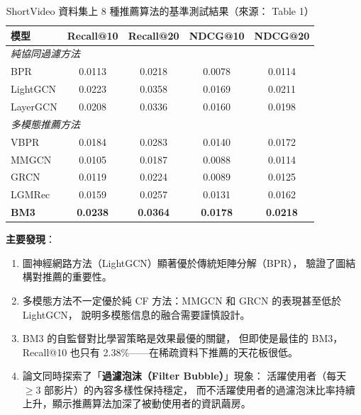 \documentclass[12pt, a4paper]{article}
\begin{document}
\begin{table}[H]
\centering
\caption{ShortVideo 資料集上 8 種推薦算法的基準測試結果（來源：\citealt{shang2025shortvideo} Table 1）}
\label{tab:original_results}
\footnotesize
\begin{tabular}{lcccc}
\toprule
\textbf{模型} & \textbf{Recall@10} & \textbf{Recall@20} & \textbf{NDCG@10} & \textbf{NDCG@20} \\
\midrule
\multicolumn{5}{l}{\textit{純協同過濾方法}} \\
BPR \citep{rendle2009bpr}        & 0.0113 & 0.0218 & 0.0078 & 0.0114 \\
LightGCN \citep{he2020lightgcn}  & 0.0223 & 0.0358 & 0.0169 & 0.0211 \\
LayerGCN \citep{zhou2023layer}   & 0.0208 & 0.0336 & 0.0160 & 0.0198 \\
\midrule
\multicolumn{5}{l}{\textit{多模態推薦方法}} \\
VBPR \citep{he2016vbpr}          & 0.0184 & 0.0283 & 0.0140 & 0.0172 \\
MMGCN \citep{wei2019mmgcn}       & 0.0105 & 0.0187 & 0.0088 & 0.0114 \\
GRCN \citep{wei2020grcn}         & 0.0119 & 0.0224 & 0.0089 & 0.0125 \\
LGMRec \citep{guo2024lgmrec}     & 0.0159 & 0.0257 & 0.0131 & 0.0162 \\
\textbf{BM3} \citep{zhou2023bootstrap} & \textbf{0.0238} & \textbf{0.0364} & \textbf{0.0178} & \textbf{0.0218} \\
\bottomrule
\end{tabular}
\end{table}

\textbf{主要發現}：
\begin{enumerate}[leftmargin=*]
\item 圖神經網路方法（LightGCN）顯著優於傳統矩陣分解（BPR），
  驗證了圖結構對推薦的重要性。
\item 多模態方法不一定優於純 CF 方法：MMGCN 和 GRCN 的表現甚至低於 LightGCN，
  說明多模態信息的融合需要謹慎設計。
\item BM3 的自監督對比學習策略是效果最優的關鍵，
  但即使是最佳的 BM3，Recall@10 也只有 2.38\%——在稀疏資料下推薦的天花板很低。
\item 論文同時探索了「\textbf{過濾泡沫（Filter Bubble）}」現象：
  活躍使用者（每天 $\geq 3$ 部影片）的內容多樣性保持穩定，
  而不活躍使用者的過濾泡沫比率持續上升，顯示推薦算法加深了被動使用者的資訊繭房。
\end{enumerate}
\end{document}
